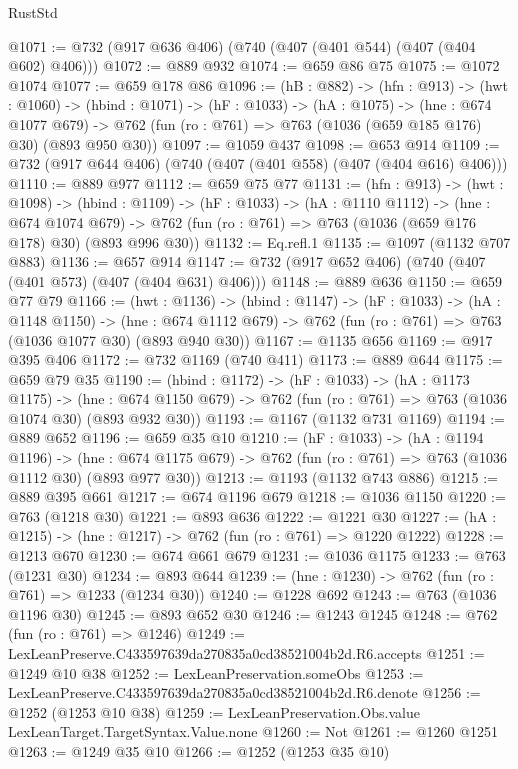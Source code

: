 \begin{lexlean}{RustStd}
\begin{coremodule}
@1071 := @732 (@917 @636 @406) (@740 (@407 (@401 @544) (@407 (@404 @602) @406)))
@1072 := @889 @932
@1074 := @659 @86 @75
@1075 := @1072 @1074
@1077 := @659 @178 @86
@1096 := (hB : @882) ->
  (hfn : @913) ->
  (hwt : @1060) ->
  (hbind : @1071) ->
  (hF : @1033) ->
  (hA : @1075) ->
  (hne : @674 @1077 @679) ->
  @762 (fun (ro : @761) => @763 (@1036 (@659 @185 @176) @30) (@893 @950 @30))
@1097 := @1059 @437
@1098 := @653 @914
@1109 := @732 (@917 @644 @406) (@740 (@407 (@401 @558) (@407 (@404 @616) @406)))
@1110 := @889 @977
@1112 := @659 @75 @77
@1131 := (hfn : @913) ->
  (hwt : @1098) ->
  (hbind : @1109) ->
  (hF : @1033) ->
  (hA : @1110 @1112) ->
  (hne : @674 @1074 @679) ->
  @762 (fun (ro : @761) => @763 (@1036 (@659 @176 @178) @30) (@893 @996 @30))
@1132 := Eq.refl.{1}
@1135 := @1097 (@1132 @707 @883)
@1136 := @657 @914
@1147 := @732 (@917 @652 @406) (@740 (@407 (@401 @573) (@407 (@404 @631) @406)))
@1148 := @889 @636
@1150 := @659 @77 @79
@1166 := (hwt : @1136) ->
  (hbind : @1147) ->
  (hF : @1033) ->
  (hA : @1148 @1150) ->
  (hne : @674 @1112 @679) -> @762 (fun (ro : @761) => @763 (@1036 @1077 @30) (@893 @940 @30))
@1167 := @1135 @656
@1169 := @917 @395 @406
@1172 := @732 @1169 (@740 @411)
@1173 := @889 @644
@1175 := @659 @79 @35
@1190 := (hbind : @1172) ->
  (hF : @1033) ->
  (hA : @1173 @1175) ->
  (hne : @674 @1150 @679) -> @762 (fun (ro : @761) => @763 (@1036 @1074 @30) (@893 @932 @30))
@1193 := @1167 (@1132 @731 @1169)
@1194 := @889 @652
@1196 := @659 @35 @10
@1210 := (hF : @1033) ->
  (hA : @1194 @1196) ->
  (hne : @674 @1175 @679) -> @762 (fun (ro : @761) => @763 (@1036 @1112 @30) (@893 @977 @30))
@1213 := @1193 (@1132 @743 @886)
@1215 := @889 @395 @661
@1217 := @674 @1196 @679
@1218 := @1036 @1150
@1220 := @763 (@1218 @30)
@1221 := @893 @636
@1222 := @1221 @30
@1227 := (hA : @1215) -> (hne : @1217) -> @762 (fun (ro : @761) => @1220 @1222)
@1228 := @1213 @670
@1230 := @674 @661 @679
@1231 := @1036 @1175
@1233 := @763 (@1231 @30)
@1234 := @893 @644
@1239 := (hne : @1230) -> @762 (fun (ro : @761) => @1233 (@1234 @30))
@1240 := @1228 @692
@1243 := @763 (@1036 @1196 @30)
@1245 := @893 @652 @30
@1246 := @1243 @1245
@1248 := @762 (fun (ro : @761) => @1246)
@1249 := LexLeanPreserve.C433597639da270835a0cd38521004b2d.R6.accepts
@1251 := @1249 @10 @38
@1252 := LexLeanPreservation.someObs
@1253 := LexLeanPreserve.C433597639da270835a0cd38521004b2d.R6.denote
@1256 := @1252 (@1253 @10 @38)
@1259 := LexLeanPreservation.Obs.value LexLeanTarget.TargetSyntax.Value.none
@1260 := Not
@1261 := @1260 @1251
@1263 := @1249 @35 @10
@1266 := @1252 (@1253 @35 @10)

\end{coremodule}
\end{lexlean}
